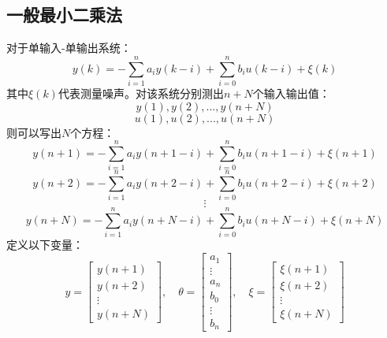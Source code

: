 \documentclass[UTF8]{article}
\begin{document}
\subsection{一般最小二乘法}
对于单输入-单输出系统：
\begin{equation*}
    y(k) = -\sum_{i = 1}^n a_iy(k - i) + \sum_{i = 0}^n b_iu(k - i) + \xi(k)
\end{equation*}
其中$\xi(k)$代表测量噪声。对该系统分别测出$n + N$个输入输出值：
\begin{equation*}
    y(1), y(2), ..., y(n + N)
\end{equation*}
\begin{equation*}
    u(1), u(2), ..., u(n + N)
\end{equation*}
则可以写出$N$个方程：
\begin{equation*}
    y(n+1) = -\sum_{i = 1}^n a_iy(n+1-i) + \sum_{i=0}^n b_iu(n+1-i) + \xi(n+1)
\end{equation*}
\begin{equation*}
    y(n+2) = -\sum_{i = 1}^n a_iy(n+2-i) + \sum_{i=0}^n b_iu(n+2-i) + \xi(n+2)
\end{equation*}
\begin{equation*}
    \vdots
\end{equation*}
\begin{equation*}
    y(n+N) = -\sum_{i = 1}^n a_iy(n+N-i) + \sum_{i=0}^n b_iu(n+N-i) + \xi(n+N)
\end{equation*}
定义以下变量：
\begin{equation*}
    y = 
    \begin{bmatrix}
        y(n+1) \\
        y(n+2) \\
        \vdots \\
        y(n+N) 
    \end{bmatrix}, \quad
    \theta = 
    \begin{bmatrix}
        a_1 \\
        \vdots \\
        a_n \\
        b_0 \\
        \vdots \\
        b_n
    \end{bmatrix}, \quad 
    \xi = 
    \begin{bmatrix}
        \xi(n+1) \\
        \xi(n+2) \\
        \vdots \\
        \xi(n+N)
    \end{bmatrix}
\end{equation*}
\end{document}
